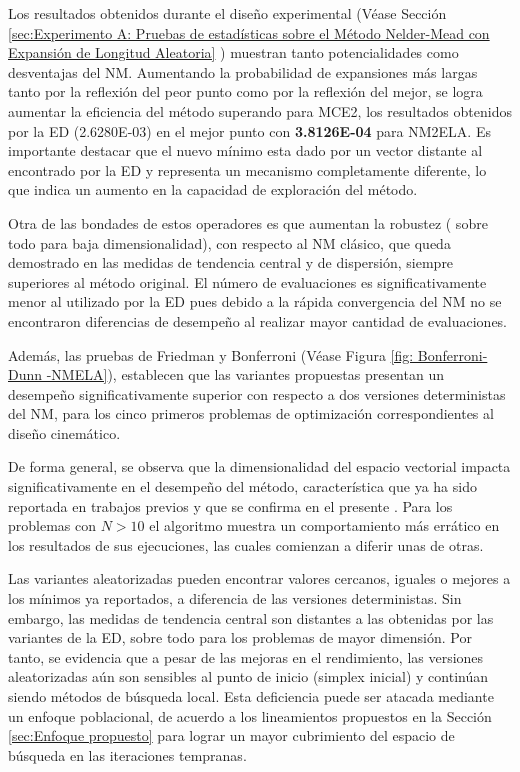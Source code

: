 Los resultados obtenidos durante el diseño experimental (Véase Sección \ref{sec:Experimento A: Pruebas de estadísticas sobre el Método Nelder-Mead con Expansión de Longitud Aleatoria} ) muestran tanto potencialidades como desventajas del NM. Aumentando la probabilidad de expansiones más largas tanto por la reflexión del peor punto como por la reflexión del mejor, se logra aumentar la eficiencia del método superando para MCE2, los resultados obtenidos por la ED (2.6280E-03) en el mejor punto con \textbf{3.8126E-04} para NM2ELA. Es importante destacar que el nuevo mínimo esta dado por un vector distante al encontrado por la ED y representa un mecanismo completamente diferente, lo que indica un aumento en la capacidad de exploración del método. 

Otra de las bondades de estos operadores es que aumentan la robustez ( sobre todo para baja dimensionalidad), con respecto al NM clásico, que queda demostrado en las medidas de tendencia central y de dispersión, siempre superiores al método original. El número de evaluaciones es significativamente menor al utilizado por la ED pues debido a la rápida convergencia del NM no se encontraron diferencias de desempeño al realizar mayor cantidad de evaluaciones. 

Además, las pruebas de Friedman y Bonferroni (Véase Figura \ref{fig: Bonferroni-Dunn -NMELA}), establecen que  las variantes propuestas presentan un desempeño significativamente superior con respecto a dos versiones deterministas del NM, para los cinco primeros problemas de optimización correspondientes al diseño cinemático.

De forma general, se observa que la dimensionalidad del espacio vectorial impacta significativamente en el desempeño del método, característica que ya ha sido reportada en trabajos previos y que se confirma en el presente \cite{han_effect_2006}. Para los problemas con $N>10$ el algoritmo muestra un comportamiento más errático en los resultados de sus ejecuciones, las cuales comienzan a diferir unas de otras. 

 Las variantes aleatorizadas pueden encontrar valores cercanos, iguales o mejores a los mínimos ya reportados, a diferencia  de las versiones deterministas. Sin embargo, las medidas de tendencia central son distantes a las obtenidas por las variantes de la ED, sobre todo para los problemas de mayor dimensión. Por tanto, se evidencia que a pesar de las mejoras en el rendimiento, las versiones aleatorizadas aún son sensibles al punto de inicio (simplex inicial) y continúan siendo métodos de búsqueda local. Esta deficiencia puede ser atacada mediante un enfoque poblacional, de acuerdo a los lineamientos propuestos en la Sección \ref{sec:Enfoque propuesto} para lograr un mayor cubrimiento del espacio de búsqueda en las iteraciones tempranas.

